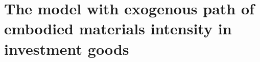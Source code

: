 \section{The model with exogenous path of embodied materials intensity in investment goods}\label{sec:app:exogenousPhiI}

